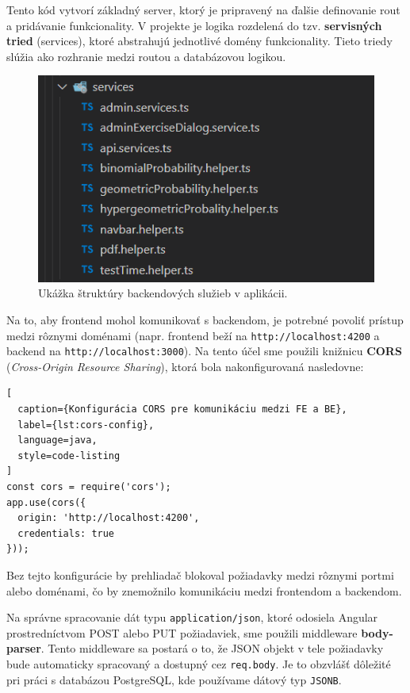 Tento kód vytvorí základný server, ktorý je pripravený na ďalšie definovanie rout a pridávanie funkcionality.
 V projekte je logika rozdelená do tzv. \textbf{servisných tried} (services), ktoré abstrahujú jednotlivé domény funkcionality.
  Tieto triedy slúžia ako rozhranie medzi routou a databázovou logikou.
\begin{figure}[H]
  \centering
  \includegraphics[width=13cm]{img/backend-services.png}
  \caption{Ukážka štruktúry backendových služieb v aplikácii.}
  \label{fig:backend-services}
\end{figure}

\bigskip
Na to, aby frontend mohol komunikovať s backendom, je potrebné povoliť prístup medzi rôznymi doménami (napr. frontend beží na \texttt{http://localhost:4200} a backend na \texttt{http://localhost:3000}). Na tento účel sme použili knižnicu \textbf{CORS} (\textit{Cross-Origin Resource Sharing}), ktorá bola nakonfigurovaná nasledovne:

\begin{lstlisting}[
  caption={Konfigurácia CORS pre komunikáciu medzi FE a BE},
  label={lst:cors-config},
  language=java,
  style=code-listing
]
const cors = require('cors');
app.use(cors({
  origin: 'http://localhost:4200',
  credentials: true
}));
\end{lstlisting}

Bez tejto konfigurácie by prehliadač blokoval požiadavky medzi rôznymi portmi alebo doménami, čo by znemožnilo komunikáciu medzi frontendom a backendom.

\bigskip
Na správne spracovanie dát typu \texttt{application/json}, ktoré odosiela Angular prostredníctvom POST alebo PUT požiadaviek, sme použili middleware \textbf{body-parser}. Tento middleware sa postará o to, že JSON objekt v tele požiadavky bude automaticky spracovaný a dostupný cez \texttt{req.body}. Je to obzvlášť dôležité pri práci s databázou PostgreSQL, kde používame dátový typ \texttt{JSONB}.


